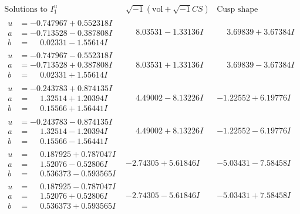 \documentclass[1p]{elsarticle_modified}
\theoremstyle{definition}
\newcommand{\I}{\sqrt{-1}}
\begin{document}
$$\begin{array}{c|c|c}  
\text{Solutions to }I^u_{1}& \I (\text{vol} + \sqrt{-1}CS) & \text{Cusp shape}\\
 \hline 
\begin{aligned}
u &= -0.747967 + 0.552318 I \\
a &= -0.713528 - 0.387808 I \\
b &= \phantom{-}0.02331 - 1.55614 I\end{aligned}
 & \phantom{-}8.03531 - 1.33136 I & \phantom{-}3.69839 + 3.67384 I \\ \hline\begin{aligned}
u &= -0.747967 - 0.552318 I \\
a &= -0.713528 + 0.387808 I \\
b &= \phantom{-}0.02331 + 1.55614 I\end{aligned}
 & \phantom{-}8.03531 + 1.33136 I & \phantom{-}3.69839 - 3.67384 I \\ \hline\begin{aligned}
u &= -0.243783 + 0.874135 I \\
a &= \phantom{-}1.32514 + 1.20394 I \\
b &= \phantom{-}0.15566 + 1.56441 I\end{aligned}
 & \phantom{-}4.49002 - 8.13226 I & -1.22552 + 6.19776 I \\ \hline\begin{aligned}
u &= -0.243783 - 0.874135 I \\
a &= \phantom{-}1.32514 - 1.20394 I \\
b &= \phantom{-}0.15566 - 1.56441 I\end{aligned}
 & \phantom{-}4.49002 + 8.13226 I & -1.22552 - 6.19776 I \\ \hline\begin{aligned}
u &= \phantom{-}0.187925 + 0.787047 I \\
a &= \phantom{-}1.52076 - 0.52806 I \\
b &= \phantom{-}0.536373 - 0.593565 I\end{aligned}
 & -2.74305 + 5.61846 I & -5.03431 - 7.58458 I \\ \hline\begin{aligned}
u &= \phantom{-}0.187925 - 0.787047 I \\
a &= \phantom{-}1.52076 + 0.52806 I \\
b &= \phantom{-}0.536373 + 0.593565 I\end{aligned}
 & -2.74305 - 5.61846 I & -5.03431 + 7.58458 I \\ \hline\begin{aligned}

\end{aligned}
\end{array}$$
\end{document}
